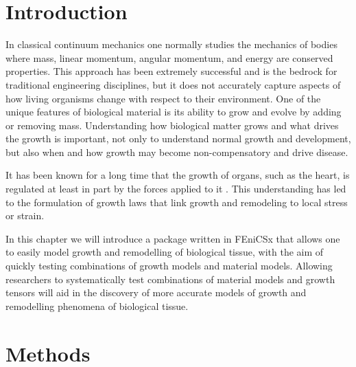 \section{Introduction}
In classical continuum mechanics one normally studies the mechanics of bodies where mass, linear momentum, angular momentum, and energy are conserved properties. This approach has been extremely successful and is the bedrock for traditional engineering disciplines, but it does not accurately capture aspects of how living organisms change with respect to their environment. One of the unique features of biological material is its ability to grow and evolve by adding or removing mass. Understanding how biological matter grows and what drives the growth is important, not only to understand normal growth and development, but also when and how growth may become non-compensatory and drive disease.\par It has been known for a long time that the growth of organs, such as the heart, is regulated at least in part by the forces applied to it \citep{Hsu1968}. This understanding has led to the formulation of growth laws that link growth and remodeling to local stress or strain. \par
In this chapter we will introduce a package written in FEniCSx that allows one to easily model growth and remodelling of biological tissue, with the aim of quickly testing combinations of growth models and material models. Allowing researchers to systematically test combinations of material models and growth tensors will aid in the discovery of more accurate models of growth and remodelling phenomena of biological tissue.
\section{Methods}
